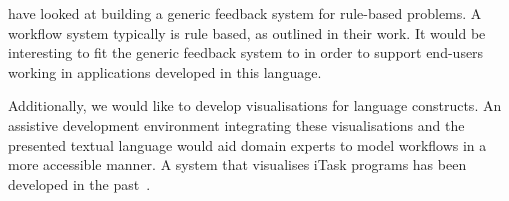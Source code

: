\citet{DBLP:conf/sfp/NausJ16} have looked at building a generic feedback system for rule-based problems.
A workflow system typically is rule based, as outlined in their work.
It would be interesting to fit the generic feedback system to \TOPHAT in order to support end-users working in applications developed in this language.

Additionally, we would like to develop visualisations for \TOPHAT language constructs.
An assistive development environment integrating these visualisations and the presented textual language
would aid domain experts to model workflows in a more accessible manner.
A system that visualises iTask programs has been developed in the past~\cite{DBLP:conf/sfp/StutterheimPA14}.
